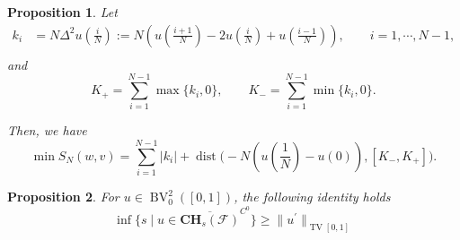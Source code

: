 \documentclass[10pt,a4paper]{amsart}
\newtheorem{proposition}{Proposition}
\begin{document}
\begin{proposition}
\label{prop:min-Sn}
Let \begin{equation}
    \label{eq:k_i}
    \begin{aligned}
        k_i &= N\Delta^2 u(\frac{i}{N}):= N(u(\frac {i+1}{N})-2u(\frac i N)+u(\frac{i-1}{N})), \qquad i=1, \cdots, N-1,\\
    \end{aligned}
\end{equation}
and
\begin{equation}
    K_+ = \sum_{i=1}^{N-1} \max\{k_i, 0\}, \qquad K_- = \sum_{i=1}^{N-1} \min\{k_i, 0\}.
\end{equation}

Then, we have
\begin{equation}
\label{eq:min-Sn}
    \min S_N(w,v) = \sum_{i=1}^{N-1} |k_i| + \operatorname{dist}\Big(-N(u(\frac 1 N)-u(0)), [K_-, K_+] \Big).
\end{equation}

\end{proposition}

\begin{proposition}
    \label{prop:interpolation_lower_bound}
    For $ u \in \operatorname{BV}^2_0([0,1])$, the following identity holds
    \begin{equation}
        \inf \{ s \mid u \in \overline{\mathbf{CH}_s(\mathcal F)}^{C^0}\}
         \ge \|{u^\prime}\|_{\operatorname{TV}[0,1]}
    \end{equation}
\end{proposition}
\end{document}
